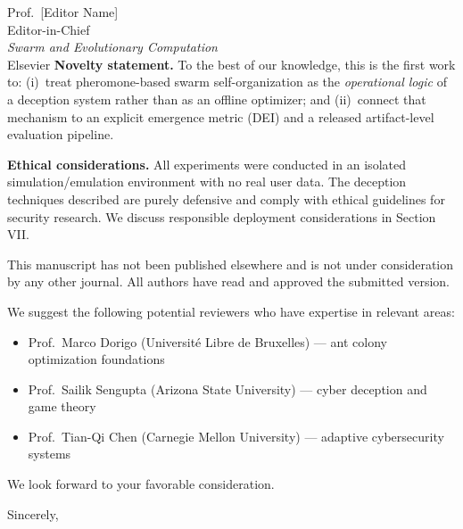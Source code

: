 \documentclass[11pt]{letter}
\begin{document}
\begin{letter}{Prof.~[Editor Name]\\
Editor-in-Chief\\
\textit{Swarm and Evolutionary Computation}\\
Elsevier}
\textbf{Novelty statement.} To the best of our knowledge, this is the first work to:
(i)~treat pheromone-based swarm self-organization as the \emph{operational logic} of a deception system rather than as an offline optimizer; and
(ii)~connect that mechanism to an explicit emergence metric (DEI) and a released artifact-level evaluation pipeline.

\textbf{Ethical considerations.} All experiments were conducted in an isolated simulation/emulation environment with no real user data. The deception techniques described are purely defensive and comply with ethical guidelines for security research. We discuss responsible deployment considerations in Section VII.

This manuscript has not been published elsewhere and is not under consideration by any other journal. All authors have read and approved the submitted version.

We suggest the following potential reviewers who have expertise in relevant areas:
\begin{itemize}
    \item Prof.~Marco Dorigo (Universit\'{e} Libre de Bruxelles) — ant colony optimization foundations
    \item Prof.~Sailik Sengupta (Arizona State University) — cyber deception and game theory
    \item Prof.~Tian-Qi Chen (Carnegie Mellon University) — adaptive cybersecurity systems
\end{itemize}

We look forward to your favorable consideration.

\closing{Sincerely,}

\end{letter}
\end{document}
